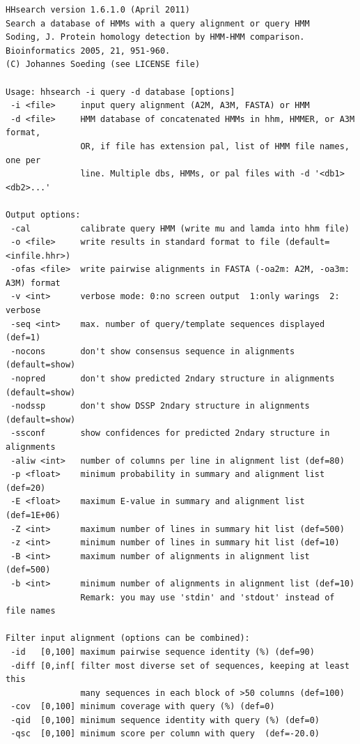\documentclass[11pt,a4paper]{article}
\begin{document}
\small \begin{verbatim}
HHsearch version 1.6.1.0 (April 2011)
Search a database of HMMs with a query alignment or query HMM
Soding, J. Protein homology detection by HMM-HMM comparison. Bioinformatics 2005, 21, 951-960.
(C) Johannes Soeding (see LICENSE file)

Usage: hhsearch -i query -d database [options]                       
 -i <file>     input query alignment (A2M, A3M, FASTA) or HMM
 -d <file>     HMM database of concatenated HMMs in hhm, HMMER, or A3M format,
               OR, if file has extension pal, list of HMM file names, one per
               line. Multiple dbs, HMMs, or pal files with -d '<db1> <db2>...'

Output options:                                                              
 -cal          calibrate query HMM (write mu and lamda into hhm file)        
 -o <file>     write results in standard format to file (default=<infile.hhr>)
 -ofas <file>  write pairwise alignments in FASTA (-oa2m: A2M, -oa3m: A3M) format
 -v <int>      verbose mode: 0:no screen output  1:only warings  2: verbose   
 -seq <int>    max. number of query/template sequences displayed (def=1) 
 -nocons       don't show consensus sequence in alignments (default=show)     
 -nopred       don't show predicted 2ndary structure in alignments (default=show)
 -nodssp       don't show DSSP 2ndary structure in alignments (default=show)  
 -ssconf       show confidences for predicted 2ndary structure in alignments
 -aliw <int>   number of columns per line in alignment list (def=80)
 -p <float>    minimum probability in summary and alignment list (def=20)   
 -E <float>    maximum E-value in summary and alignment list (def=1E+06)       
 -Z <int>      maximum number of lines in summary hit list (def=500)         
 -z <int>      minimum number of lines in summary hit list (def=10)         
 -B <int>      maximum number of alignments in alignment list (def=500)      
 -b <int>      minimum number of alignments in alignment list (def=10)      
               Remark: you may use 'stdin' and 'stdout' instead of file names

Filter input alignment (options can be combined):                             
 -id   [0,100] maximum pairwise sequence identity (%) (def=90)   
 -diff [0,inf[ filter most diverse set of sequences, keeping at least this    
               many sequences in each block of >50 columns (def=100)
 -cov  [0,100] minimum coverage with query (%) (def=0) 
 -qid  [0,100] minimum sequence identity with query (%) (def=0) 
 -qsc  [0,100] minimum score per column with query  (def=-20.0)


\end{verbatim}
\end{document}

